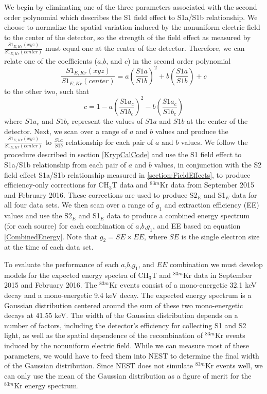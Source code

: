 \documentclass[a4paper,10pt,twocolumn]{article}
\begin{document}
We begin by eliminating one of the three parameters associated with the second order polynomial which describes the S1 field effect to S1a/S1b relationship.  We choose to normalize the spatial variation induced by the nonuniform electric field to the center of the detector, so the strength of the field effect as measured by $\frac{S1_{E,Kr}(xyz)}{S1_{E,Kr}(center)}$ must equal one at the center of the detector.  Therefore, we can relate one of the coefficients ($a$,$b$, and $c$) in the second order polynomial
\begin{equation}
 \frac{S1_{E,Kr}(xyz)}{S1_{E,Kr}(center)} = a\left(\frac{S1a}{S1b}\right)^2 + b\left(\frac{S1a}{S1b} \right) + c
 \end{equation}
 to the other two, such that
 \begin{equation}
 c=1-a\left(\frac{S1a_c}{S1b_c}\right)^2-b\left(\frac{S1a_c}{S1b_c}\right)
 \end{equation}
 where $S1a_c$ and $S1b_c$ represent the values of $S1a$ and $S1b$ at the center of the detector.  Next, we scan over a range of $a$ and $b$ values and produce the $\frac{S1_{E,Kr}(xyz)}{S1_{E,Kr}(center)}$ to $\frac{S1a}{S1b}$ relationship for each pair of $a$ and $b$ values.  We follow the procedure described in section \ref{KrypCalCode} and use the S1 field effect to S1a/S1b relationship from each pair of $a$ and $b$ values, in conjunction with the S2 field effect S1a/S1b relationship measured in \ref{section:FieldEffects}, to produce efficiency-only corrections for CH$_3$T data and $^{83m}$Kr data from September 2015 and February 2016. These corrections are used to produce S2$_E$ and S1$_E$ data for all four data sets.  We then scan over a range of $g_1$ and extraction efficiency (EE) values and use the S2$_E$ and S1$_E$ data to produce a combined energy spectrum (for each source) for each combination of $a$,$b$,$g_1$, and EE based on equation \ref{CombinedEnergy}.  Note that $g_2=SE \times EE$, where $SE$ is the single electron size at the time of each data set.  

To evaluate the performance of each $a$,$b$,$g_1$, and $EE$ combination we must develop models for the expected energy spectra of CH$_3$T and $^{83m}$Kr data in September 2015 and February 2016.  The $^{83m}$Kr events consist of a mono-energetic 32.1 keV decay and a mono-energetic 9.4 keV decay.  The expected energy spectrum is a Gaussian distribution centered around the sum of these two mono-energetic decays at 41.55 keV.  The width of the Gaussian distribution depends on a number of factors, including the detector's efficiency for collecting S1 and S2 light, as well as the spatial dependence of the recombination of $^{83m}$Kr events induced by the nonuniform electric field.  While we can measure most of these parameters, we would have to feed them into NEST to determine the final width of the Gaussian distribution.  Since NEST does not simulate $^{83m}$Kr events well, we can only use the mean of the Gaussian distribution as a figure of merit for the $^{83m}$Kr energy spectrum.
\end{document}
